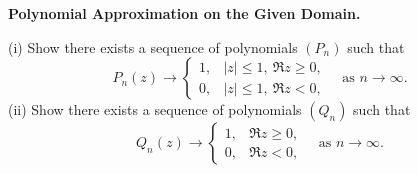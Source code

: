 \begin{problem}[CP-II-0488]
\label{prob:cp-ii-0488}
\textbf{Polynomial Approximation on the Given Domain.}

	(i) Show there exists a sequence of polynomials $(P_n)$ such that
	\[
	P_n(z)\longrightarrow
	\begin{cases}
		1,& |z|\le1,\ \Re z\ge0,\\
		0,& |z|\le1,\ \Re z<0,
	\end{cases}
	\quad\text{as }n\to\infty.
	\]
	(ii) Show there exists a sequence of polynomials $(Q_n)$ such that
	\[
	Q_n(z)\longrightarrow
	\begin{cases}
		1,& \Re z\ge0,\\
		0,& \Re z<0,
	\end{cases}
	\quad\text{as }n\to\infty.
	\]
\end{problem}

